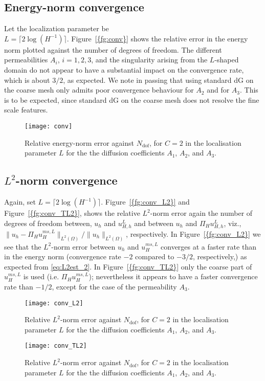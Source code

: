 \documentclass[10pt]{article}
\numberwithin{equation}{section}
\theoremstyle{plain}
\theoremstyle{definition}
\theoremstyle{remark}
\begin{document}
\subsection{Energy-norm convergence}
Let the localization parameter be \\$L=\lceil 2\log(H^{-1})\rceil$. {Figure~\ref{{fg:conv}}} shows the relative error in the energy norm plotted against the number of degrees of freedom.
The different permeabilities $A_i$, $i=1,2,3$, and the singularity arising from the $L$-shaped domain do not appear to have a substantial impact on the convergence rate, which is about  $3/2$, as expected. We note in passing that using standard dG on the coarse mesh only admits poor convergence behaviour for $A_2$ and for $A_3$. This is to be expected, since standard dG on the coarse mesh does not resolve the fine scale features. 
\begin{figure}[th!]
  \centering
 \texttt{[image: conv]}
 \caption{Relative energy-norm error against $N_{\text{dof}}$, for $C=2$ in the localisation parameter $L$ for the the diffusion coefficients $A_1$, $A_2$, and $A_3$.}
 \label{fg:conv}
\end{figure}

\subsection{$L^2$-norm convergence}
Again, set $L=\lceil 2\log(H^{-1})\rceil$. {Figure~\ref{{fg:conv_L2}}} and {Figure~\ref{{fg:conv_TL2}}}, shows the relative $L^2$-norm error again the number of degrees of freedom between, $u_h$ and $u_{H,h}^L$ and between $u_h$ and ${\Pi_H} u_{H,h}^L$, viz., $\|u_h-{\Pi_H} u_{H}^{ms,L}\|_{L^2(\Omega)}/\|u_h\|_{L^2(\Omega)}$, respectively. In {Figure~\ref{{fg:conv_L2}}} we see that the $L^2$-norm error between $u_h$ and $u_H^{ms,L}$ converges at a faster rate than in the energy norm (convergence rate $-2$ compared to $-3/2$, respectively,) as expected from \eqref{eq:L2est_2}. In {Figure~\ref{{fg:conv_TL2}}} only the coarse part of $u_H^{ms,L}$ is used (i.e. ${\Pi_H} u_H^{ms,L}$); nevertheless it appears to have a faster convergence rate than $-1/2$,  except for the case of the permeability ${A}_3$.
\begin{figure}[th!]
  \centering
 \texttt{[image: conv\_L2]}
 \caption{Relative $L^2$-norm error against $N_{\text{dof}}$, for $C=2$ in the localisation parameter $L$ for the the diffusion coefficients $A_1$, $A_2$, and $A_3$.}
 \label{fg:conv_L2}
\end{figure}
\begin{figure}[th!]
  \centering
 \texttt{[image: conv\_TL2]}
 \caption{Relative $L^2$-norm error against $N_{\text{dof}}$, for $C=2$ in the localisation parameter $L$ for the the diffusion coefficients $A_1$, $A_2$, and $A_3$.}
\label{fg:conv_TL2}
\end{figure}
\end{document}
